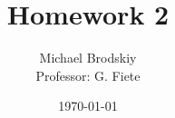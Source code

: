 


\title{Homework 2}
\date{\today}
\author{Michael Brodskiy\\ \small Professor: G. Fiete}



\maketitle

